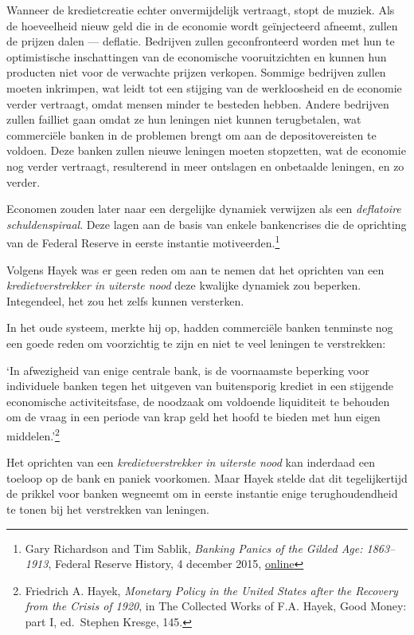 \documentclass[
  a5paper,
  smalldemyvopaper,11pt,twoside,onecolumn,openright,extrafontsizes,
hidelinks]{memoir}
\renewenvironment{quote}%
               {\list{}{\rightmargin=.3cm\leftmargin=.3cm}%
                \itshape \item[]}%
               {\endlist}
\begin{document}
Wanneer de kredietcreatie echter onvermijdelijk vertraagt, stopt de
muziek. Als de hoeveelheid nieuw geld die in de economie wordt
geïnjecteerd afneemt, zullen de prijzen dalen --- deflatie. Bedrijven
zullen geconfronteerd worden met hun te optimistische inschattingen van
de economische vooruitzichten en kunnen hun producten niet voor de
verwachte prijzen verkopen. Sommige bedrijven zullen moeten inkrimpen,
wat leidt tot een stijging van de werkloosheid en de economie verder
vertraagt, omdat mensen minder te besteden hebben. Andere bedrijven
zullen failliet gaan omdat ze hun leningen niet kunnen terugbetalen, wat
commerciële banken in de problemen brengt om aan de depositovereisten te
voldoen. Deze banken zullen nieuwe leningen moeten stopzetten, wat de
economie nog verder vertraagt, resulterend in meer ontslagen en
onbetaalde leningen, en zo verder.

Economen zouden later naar een dergelijke dynamiek verwijzen als een
\emph{deflatoire schuldenspiraal}. Deze lagen aan de basis van enkele
bankencrises die de oprichting van de Federal Reserve in eerste
instantie motiveerden.\footnote{Gary Richardson and Tim Sablik,
  \emph{Banking Panics of the Gilded Age: 1863--1913}, Federal Reserve
  History, 4 december 2015,
  \href{https://www.federalreservehistory.org/essays/banking-panics-of-the-gilded-age.}{online}}

Volgens Hayek was er geen reden om aan te nemen dat het oprichten van
een \emph{kredietverstrekker in uiterste nood} deze kwalijke dynamiek
zou beperken. Integendeel, het zou het zelfs kunnen versterken.

In het oude systeem, merkte hij op, hadden commerciële banken tenminste
nog een goede reden om voorzichtig te zijn en niet te veel leningen te
verstrekken:

\begin{quote}
`In afwezigheid van enige centrale bank, is de voornaamste beperking
voor individuele banken tegen het uitgeven van buitensporig krediet in
een stijgende economische activiteitsfase, de noodzaak om voldoende
liquiditeit te behouden om de vraag in een periode van krap geld het
hoofd te bieden met hun eigen middelen.'\footnote{\hspace{0pt}Friedrich
  A. Hayek, \emph{Monetary Policy in the United States after the
  Recovery from the Crisis of 1920}, in The Collected Works of F.A.
  Hayek, Good Money: part I, ed.~Stephen Kresge, 145.}
\end{quote}

Het oprichten van een \emph{kredietverstrekker in uiterste nood} kan
inderdaad een toeloop op de bank en paniek voorkomen. Maar Hayek stelde
dat dit tegelijkertijd de prikkel voor banken wegneemt om in eerste
instantie enige terughoudendheid te tonen bij het verstrekken van
leningen.
\end{document}
